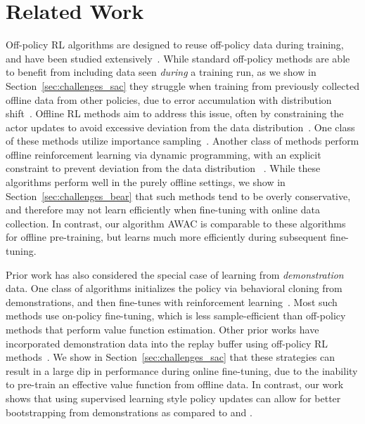 \documentclass[conference]{IEEEtran}
\begin{document}
\section{Related Work}\label{sec:related_work}
Off-policy RL algorithms are designed to reuse off-policy data during training, and have been studied extensively~\citep{konda2000actorcritic, degris2012, mnih2016asynchronous, haarnoja2018sac, fujimoto2018td3, bhatnagar2009, peters2008, zhang2019, pawel2009, balduzzi2015}. While standard off-policy methods are able to benefit from including data seen \emph{during} a training run, as we show in Section~\ref{sec:challenges_sac} they struggle when training from previously collected offline data from other policies, due to error accumulation with distribution shift~\citep{fujimoto19bcq, kumar19bear}. Offline RL methods aim to address this issue, often by constraining the actor updates to avoid excessive deviation from the data distribution~\citep{lange2012, thomas2016, hallak2015offpolicy, hallak2016td, hallak2017onlineoffpolicy, agarwal2019optimism, kumar19bear, fujimoto19bcq, rasool2019p3o, nachum2019dualdice, siegel2020abm, levine2020offlinetutorial, zhang2020gendice}. One class of these methods utilize importance sampling~\citep{thomas2016, zhang2020gendice, nachum2019dualdice, degris2012, jiang2016doublyrobust, hallak2017onlineoffpolicy}. 
Another class of methods perform offline reinforcement learning via dynamic programming, with an explicit constraint to prevent deviation from the data distribution ~\citep{lange2012, kumar19bear, fujimoto19bcq, wu2019brac, jaques2019}. While these algorithms perform well in the purely offline settings, we show in Section~\ref{sec:challenges_bear} that such methods tend to be overly conservative, and therefore may not learn efficiently when fine-tuning with online data collection. In contrast, our algorithm AWAC is comparable to these algorithms for offline pre-training, but learns much more efficiently during subsequent fine-tuning. 

Prior work has also considered the special case of learning from \emph{demonstration} data. One class of algorithms initializes the policy via behavioral cloning from demonstrations, and then fine-tunes with reinforcement learning~\citep{peters2008baseball, ijspeert2002attractor, Theodorou2010, kim2013apid, rajeswaran2018dextrous, gupta2019relay, zhu2019hands}. Most such methods use on-policy fine-tuning, which is less sample-efficient than off-policy methods that perform value function estimation. 
Other prior works have incorporated demonstration data into the replay buffer using off-policy RL methods~\citep{vecerik17ddpgfd, nair2017icra}. We show in Section~\ref{sec:challenges_sac} that these strategies can result in a large dip in performance during online fine-tuning, due to the inability to pre-train an effective value function from offline data.
In contrast, our work shows that using supervised learning style policy updates can allow for better bootstrapping from demonstrations as compared to \citet{vecerik17ddpgfd} and \citet{nair2017icra}.
\end{document}
